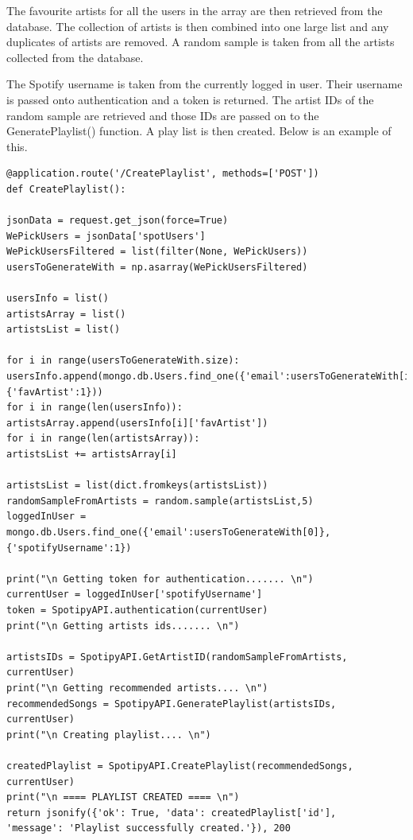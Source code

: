 The favourite artists for all the users in the array are then retrieved from the database. The collection of artists is then combined into one large list and any duplicates of artists are removed. A random sample is taken from all the artists collected from the database.\newline 

The Spotify username is taken from the currently logged in user. Their username is passed onto authentication and a token is returned. The artist IDs of the random sample are retrieved and those IDs are passed on to the GeneratePlaylist() function. A play list is then created.\newline
Below is an example of this.\newline
\begin{verbatim}
@application.route('/CreatePlaylist', methods=['POST'])
def CreatePlaylist():

jsonData = request.get_json(force=True)
WePickUsers = jsonData['spotUsers']
WePickUsersFiltered = list(filter(None, WePickUsers))
usersToGenerateWith = np.asarray(WePickUsersFiltered)

usersInfo = list()
artistsArray = list()
artistsList = list()

for i in range(usersToGenerateWith.size):
usersInfo.append(mongo.db.Users.find_one({'email':usersToGenerateWith[i]},
{'favArtist':1})) 
for i in range(len(usersInfo)):
artistsArray.append(usersInfo[i]['favArtist'])
for i in range(len(artistsArray)):
artistsList += artistsArray[i]

artistsList = list(dict.fromkeys(artistsList))
randomSampleFromArtists = random.sample(artistsList,5)
loggedInUser = mongo.db.Users.find_one({'email':usersToGenerateWith[0]},
{'spotifyUsername':1})

print("\n Getting token for authentication....... \n")
currentUser = loggedInUser['spotifyUsername']
token = SpotipyAPI.authentication(currentUser)
print("\n Getting artists ids....... \n")

artistsIDs = SpotipyAPI.GetArtistID(randomSampleFromArtists, currentUser)
print("\n Getting recommended artists.... \n")
recommendedSongs = SpotipyAPI.GeneratePlaylist(artistsIDs, currentUser)
print("\n Creating playlist.... \n")

createdPlaylist = SpotipyAPI.CreatePlaylist(recommendedSongs, currentUser)
print("\n ==== PLAYLIST CREATED ==== \n")
return jsonify({'ok': True, 'data': createdPlaylist['id'], 
'message': 'Playlist successfully created.'}), 200

\end{verbatim}


